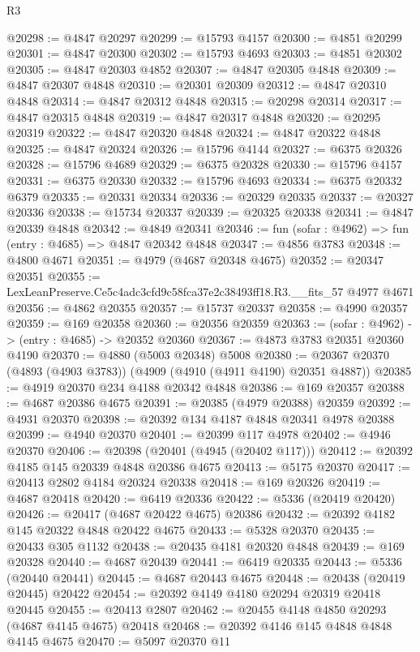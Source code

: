 \begin{lexlean}{R3}
\begin{coremodule}
@20298 := @4847 @20297
@20299 := @15793 @4157
@20300 := @4851 @20299
@20301 := @4847 @20300
@20302 := @15793 @4693
@20303 := @4851 @20302
@20305 := @4847 @20303 @4852
@20307 := @4847 @20305 @4848
@20309 := @4847 @20307 @4848
@20310 := @20301 @20309
@20312 := @4847 @20310 @4848
@20314 := @4847 @20312 @4848
@20315 := @20298 @20314
@20317 := @4847 @20315 @4848
@20319 := @4847 @20317 @4848
@20320 := @20295 @20319
@20322 := @4847 @20320 @4848
@20324 := @4847 @20322 @4848
@20325 := @4847 @20324
@20326 := @15796 @4144
@20327 := @6375 @20326
@20328 := @15796 @4689
@20329 := @6375 @20328
@20330 := @15796 @4157
@20331 := @6375 @20330
@20332 := @15796 @4693
@20334 := @6375 @20332 @6379
@20335 := @20331 @20334
@20336 := @20329 @20335
@20337 := @20327 @20336
@20338 := @15734 @20337
@20339 := @20325 @20338
@20341 := @4847 @20339 @4848
@20342 := @4849 @20341
@20346 := fun (sofar : @4962) => fun (entry : @4685) => @4847 @20342 @4848
@20347 := @4856 @3783
@20348 := @4800 @4671
@20351 := @4979 (@4687 @20348 @4675)
@20352 := @20347 @20351
@20355 := LexLeanPreserve.Ce5c4adc3cfd9c58fca37e2c38493ff18.R3.__fits_57 @4977 @4671
@20356 := @4862 @20355
@20357 := @15737 @20337
@20358 := @4990 @20357
@20359 := @169 @20358
@20360 := @20356 @20359
@20363 := (sofar : @4962) -> (entry : @4685) -> @20352 @20360
@20367 := @4873 @3783 @20351 @20360 @4190
@20370 := @4880 (@5003 @20348) @5008
@20380 := @20367 @20370 (@4893 (@4903 @3783)) (@4909 (@4910 (@4911 @4190) @20351 @4887))
@20385 := @4919 @20370 @234 @4188 @20342 @4848
@20386 := @169 @20357
@20388 := @4687 @20386 @4675
@20391 := @20385 (@4979 @20388) @20359
@20392 := @4931 @20370
@20398 := @20392 @134 @4187 @4848 @20341 @4978 @20388
@20399 := @4940 @20370
@20401 := @20399 @117 @4978
@20402 := @4946 @20370
@20406 := @20398 (@20401 (@4945 (@20402 @117)))
@20412 := @20392 @4185 @145 @20339 @4848 @20386 @4675
@20413 := @5175 @20370
@20417 := @20413 @2802 @4184 @20324 @20338
@20418 := @169 @20326
@20419 := @4687 @20418
@20420 := @6419 @20336
@20422 := @5336 (@20419 @20420)
@20426 := @20417 (@4687 @20422 @4675) @20386
@20432 := @20392 @4182 @145 @20322 @4848 @20422 @4675
@20433 := @5328 @20370
@20435 := @20433 @305 @1132
@20438 := @20435 @4181 @20320 @4848
@20439 := @169 @20328
@20440 := @4687 @20439
@20441 := @6419 @20335
@20443 := @5336 (@20440 @20441)
@20445 := @4687 @20443 @4675
@20448 := @20438 (@20419 @20445) @20422
@20454 := @20392 @4149 @4180 @20294 @20319 @20418 @20445
@20455 := @20413 @2807
@20462 := @20455 @4148 @4850 @20293 (@4687 @4145 @4675) @20418
@20468 := @20392 @4146 @145 @4848 @4848 @4145 @4675
@20470 := @5097 @20370 @11

\end{coremodule}
\end{lexlean}
